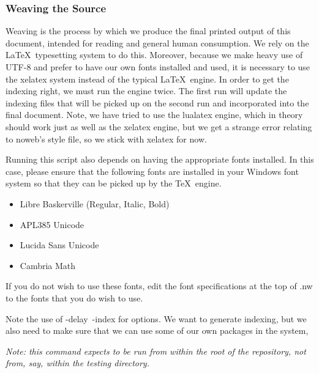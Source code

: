 \documentclass{article}%
\begin{document}
\subsubsection{Weaving the Source}

Weaving is the process by which we produce the final printed output
of this document,
intended for reading and general human consumption.
We rely on the \LaTeX\ typesetting system to do this.
Moreover, because we make heavy use of UTF-8 and prefer to have our
own fonts installed and used,
it is necessary to use the {\Tt{}xelatex\nwendquote} system instead of the typical
\LaTeX\ engine.
In order to get the indexing right, we must run the engine twice.
The first run will update the indexing files that will be picked
up on the second run and incorporated into the final document.
Note, we have tried to use the {\Tt{}lualatex\nwendquote} engine, which in theory
should work just as well as the {\Tt{}xelatex\nwendquote} engine, but we get a
strange error relating to noweb's style file, so we stick with
{\Tt{}xelatex\nwendquote} for now.

Running this script also depends on having the appropriate fonts
installed.
In this case, please ensure that the following fonts are installed
in your Windows font system so that they can be picked up by the \TeX\
engine.

\begin{itemize}
        \item Libre Baskerville (Regular, Italic, Bold)
        \item APL385 Unicode
        \item Lucida Sans Unicode
        \item Cambria Math
\end{itemize}

\noindent
If you do not wish to use these fonts, 
edit the font specifications at the top of {\Tt{}.nw\nwendquote}
to the fonts that you do wish to use.

Note the use of {\Tt{}-delay\ -index\nwendquote} for options. We want to generate
indexing, but we also need to make sure that we can use some of our
own packages in the system,

\emph{Note: this command expects to be run from within the root of
the repository, not from, say, within the {\Tt{}testing\nwendquote} directory.}
\end{document}
